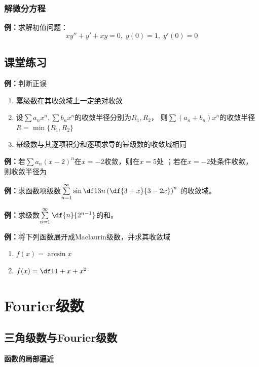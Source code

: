 \subsubsection{解微分方程}

{\bf 例：}求解初值问题：$$xy''+y'+xy=0,\;y(0)=1,\;y'(0)=0$$

\subsection{课堂练习}

{\bf 例：}判断正误
\begin{enumerate}[(1)]
  \setlength{\itemindent}{1cm}
  \item 幂级数在其收敛域上一定绝对收敛 \;{{$(\;\times\;)$}} 
  \item 设$\sum a_nx^n,\sum b_nx^n$的收敛半径分别为$R_1,R_2$，
  则$\sum(a_n+b_n)x^n$的收敛半径$R=\min\{R_1,R_2\}$ 
  \;{{$(\;\times\;)$}} 
  \item 幂级数与其逐项积分和逐项求导的幂级数的收敛域相同 
  \;{{$(\;\times\;)$}}
\end{enumerate}

{\bf 例：}若$\sum a_n(x-2)^n$在$x=-2$收敛，则在$x=5$处
\underline{\;}；若在$x=-2$处条件收敛，
则收敛半径为\underline{\;}

{\bf 例：}求函数项级数$\sum\limits_{n=1}^{\infty}
\sin\df 1 {3n}\left(\df{3+x}{3-2x}\right)^n$
的收敛域。

{\bf 例：}求级数$\sum\limits_{n=1}^{\infty}\df{n}{2^{n-1}}$的和。

{\bf 例：}将下列函数展开成Maclaurin级数，并求其收敛域
\begin{enumerate}[(1)]
  \setlength{\itemindent}{1cm}
  \item $f(x)=\arcsin x$
  \item $f(x)=\df 1{1+x+x^2}$
\end{enumerate}

\section{Fourier级数}

\subsection{三角级数与Fourier级数}

{\bf 函数的局部逼近}

